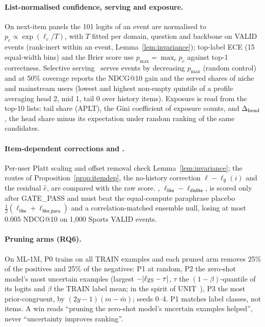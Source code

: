 \paragraph{List-normalised confidence, serving and exposure.}
On next-item panels the 101 logits of an event are normalised to $p_c\propto\exp(\ell_c/T)$, with $T$ fitted per domain, question and
backbone on VALID events (rank-inert within an event, Lemma~\ref{lem:invariance}); top-label ECE (15 equal-width bins) and the Brier
score use $p_{\max}=\max_c p_c$ against top-1 correctness. Selective serving~\citep{geifman2017selective} serves events by decreasing
$p_{\max}$ (random control) and at 50\% coverage reports the NDCG@10 gain and the served shares of niche and mainstream users (lowest
and highest non-empty quintile of a profile averaging head 2, mid 1, tail 0 over history items). Exposure is read from the top-10
lists: tail share (APLT), the Gini coefficient of exposure counts, and $\Delta_{\rm head}$, the head share minus its expectation under
random ranking of the same candidates.

\paragraph{Item-dependent corrections and \method{}.}
Per-user Platt scaling and offset removal check Lemma~\ref{lem:invariance}; the routes of Proposition~\ref{prop:itemdep}, the
no-history correction $\ell-\ell_\emptyset(i)$ and the residual $\hat e$, are compared with the raw score. \method{},
$\ell_{\textsf{like}}-\ell_{\textsf{dislike}}$, is scored only after GATE\_PASS and must beat the equal-compute paraphrase placebo
$\tfrac12(\ell_{\textsf{like}}+\ell_{\textsf{like\_para}})$ and a correlation-matched ensemble null, losing at most $0.005$ NDCG@10 on
1,000 Sports VALID events.

\paragraph{Pruning arms (RQ6).}
On ML-1M, P0 trains on all TRAIN examples and each pruned arm removes 25\% of the positives and 25\% of the negatives: P1 at random,
P2 the zero-shot model's most uncertain examples (largest $-|\ell_{\rm ZS}-\tau|$, $\tau$ the $(1-\beta)$-quantile of its logits and
$\beta$ the TRAIN label mean; in the spirit of UNIT~\citep{wu2025unit}), P3 the most prior-congruent, by $(2y-1)(m-\bar m)$; seeds 0--4.
P1 matches label classes, not items. A win reads ``pruning the zero-shot model's uncertain examples helped'', never ``uncertainty
improves ranking''.

